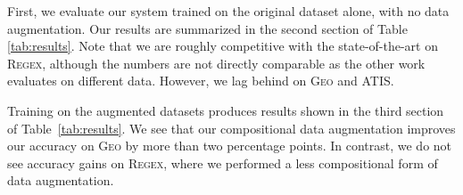 \documentclass[11pt,letterpaper]{article}
\newcommand{\atis}{\textsc{ATIS}\xspace}
\newcommand{\regex}{\textsc{Regex}\xspace}
\newcommand{\geo}{\textsc{Geo}\xspace}
\begin{document}
First, we evaluate our system trained on the original dataset alone,
with no data augmentation.
Our results are summarized in the second section of Table \ref{tab:results}.
Note that we are roughly competitive with the state-of-the-art on \regex, 
although the numbers are not directly
comparable as the other work evaluates on different data.
However, we lag behind on \geo and \atis.

Training on the augmented datasets produces results shown in the
third section of Table~\ref{tab:results}.
We see that our compositional data augmentation improves 
our accuracy on \geo by more than two percentage points.
In contrast, we do not see accuracy gains on \regex, 
where we performed a less compositional form of data augmentation.

\end{document}
